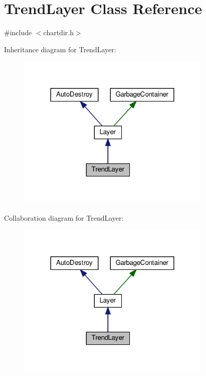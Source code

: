 \hypertarget{class_trend_layer}{}\section{Trend\+Layer Class Reference}
\label{class_trend_layer}


{\ttfamily \#include $<$chartdir.\+h$>$}



Inheritance diagram for Trend\+Layer\+:
\nopagebreak
\begin{figure}[H]
\begin{center}
\leavevmode
\includegraphics[width=264pt]{class_trend_layer__inherit__graph}
\end{center}
\end{figure}


Collaboration diagram for Trend\+Layer\+:
\nopagebreak
\begin{figure}[H]
\begin{center}
\leavevmode
\includegraphics[width=264pt]{class_trend_layer__coll__graph}
\end{center}
\end{figure}
